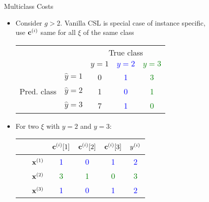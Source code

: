 \documentclass[11pt,compress,t,notes=noshow, xcolor=table]{beamer}
\begin{document}
\begin{vbframe}{Multiclass Costs}
    \begin{itemize}

        \item Consider $g > 2$. Vanilla CSL is special case of instance specific,\\use $\mathbf{c}^{(i)}$ same for all $\xi$ of the same class
        
        \vspace{5pt}
        \begin{center}
                            \begin{tabular}{cc|ccc}
        			& &\multicolumn{3}{c}{True class} \\
        			& & $y=1$ & \textcolor{blue}{$y=2$} & \textcolor{green}{$y=3$}  \\
        			\hline
        			\multirow{3}{*}{\parbox{0.6cm}{Pred.  class}} & $\hat y=1$ & 0 & \textcolor{blue}{1} & \textcolor{green}{3}\\
        			& $\hat y=2$ & 1 & \textcolor{blue}{0} & \textcolor{green}{1}\\
                        & $\hat y=3$ & 7 & \textcolor{blue}{1} & \textcolor{green}{0}\\
                \end{tabular}
        \end{center}
        \vspace{5pt}
        
        \item For two $\xi$ with $y=2$ and $y = 3$: %
                \vspace{5pt}

                \begin{center}
                            \begin{tabular}{cc|cccc}\
        			& & $\mathbf{c}^{(i)}[1]$ & $\mathbf{c}^{(i)}[2]$ & $\mathbf{c}^{(i)}[3]$ & $y^{(i)}$ \\
        			\hline & $\mathbf{x}^{(1)}$ & \textcolor{blue}{1} & \textcolor{blue}{0} & \textcolor{blue}{1} & \textcolor{blue}{2}\\
        			& $\mathbf{x}^{(2)}$ & \textcolor{green}{3} & \textcolor{green}{1} & \textcolor{green}{0} & \textcolor{green}{3}\\
                        & $\mathbf{x}^{(3)}$ & \textcolor{blue}{1} & \textcolor{blue}{0} & \textcolor{blue}{1} & \textcolor{blue}{2}\\
                \end{tabular}
        \end{center}
                \vspace{5pt}


\end{itemize}
\end{vbframe}
\end{document}
